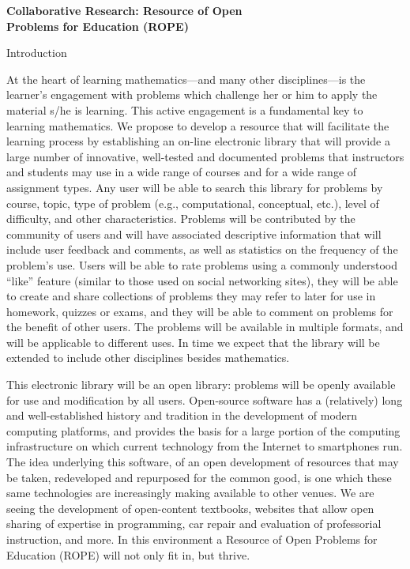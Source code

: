 \documentclass[11pt]{article}
\begin{document}
\begin{center}
{\Large \textbf{Collaborative Research: Resource of Open\\
Problems for Education (ROPE)}}
\end{center}

\begin{section}{Introduction}

At the heart of learning mathematics---and many other disciplines---is the
learner's engagement with problems which challenge her or him to apply the
material s/he is learning.  This active engagement is a fundamental key to
learning mathematics.  We propose to develop a resource that will
facilitate the learning process by establishing an on-line electronic
library that will provide a large number of innovative, well-tested and
documented problems that instructors and students may use in a wide range
of courses and for a wide range of assignment types.  Any user will be
able to search this library for problems by course, topic, type of problem
(e.g., computational, conceptual, etc.), level of difficulty, and other
characteristics.  Problems will be contributed by the community of users
and will have associated descriptive information that will include user
feedback and comments, as well as statistics on the frequency of the
problem's use.  Users will be able to rate problems using a commonly
understood ``like'' feature (similar to those used on social networking
sites), they will be able to create and share collections of problems they
may refer to later for use in homework, quizzes or exams, and they will be
able to comment on problems for the benefit of other users.  The problems
will be available in multiple formats, and will be applicable to different
uses.  In time we expect that the library will be extended to include
other disciplines besides mathematics.

This electronic library will be an open library: problems will be openly
available for use and modification by all users.  Open-source software has
a (relatively) long and well-established history and tradition in the
development of modern computing platforms, and provides the basis for a
large portion of the computing infrastructure on which current technology
from the Internet to smartphones run.  The idea underlying this software,
of an open development of resources that may be taken, redeveloped and
repurposed for the common good, is one which these same technologies are
increasingly making available to other venues. We are seeing the
development of open-content textbooks, websites that allow open sharing of
expertise in programming, car repair and evaluation of professorial
instruction, and more.  In this environment a Resource of Open Problems for Education (ROPE) will
not only fit in, but thrive.


\end{section}
\end{document}
